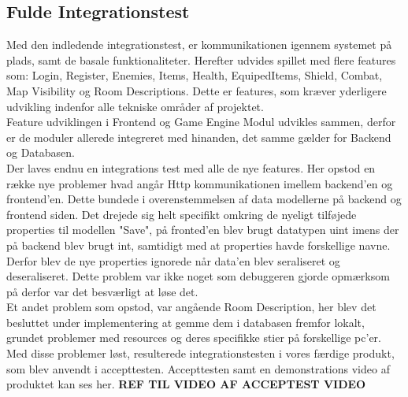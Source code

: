 
\subsection{Fulde Integrationstest}

Med den indledende integrationstest, er kommunikationen igennem systemet på plads, samt de basale funktionaliteter. Herefter udvides spillet med flere features som: Login, Register, Enemies, Items, Health, EquipedItems, Shield, Combat, Map Visibility og Room Descriptions. Dette er features, som kræver yderligere udvikling indenfor alle tekniske områder af projektet.\\

\noindent Feature udviklingen i Frontend og Game Engine Modul udvikles sammen, derfor er de moduler allerede integreret med hinanden, det samme gælder for Backend og Databasen.\\

\noindent Der laves endnu en integrations test med alle de nye features. Her opstod en række nye problemer hvad angår Http kommunikationen imellem backend'en og frontend'en. Dette bundede i overenstemmelsen af data modellerne på backend og frontend siden. Det drejede sig helt specifikt omkring de nyeligt tilføjede properties til modellen "Save", på fronted'en blev brugt datatypen uint imens der på backend blev brugt int, samtidigt med at properties havde forskellige navne. Derfor blev de nye properties ignorede når data'en blev seraliseret og deseraliseret. Dette problem var ikke noget som debuggeren gjorde opmærksom på derfor var det besværligt at løse det.\\

\noindent Et andet problem som opstod, var angående Room Description, her blev det besluttet under implementering at gemme dem i databasen fremfor lokalt, grundet problemer med resources og deres specifikke stier på forskellige pc'er.\\

\noindent Med disse problemer løst, resulterede integrationstesten i vores færdige produkt, som blev anvendt i accepttesten. Accepttesten samt en demonstrations video af produktet kan ses her. \textbf{REF TIL VIDEO AF ACCEPTEST VIDEO}    
 

  

